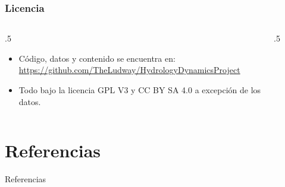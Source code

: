 \documentclass[17pt, t, lualatex]{beamer}
\begin{document}
   



\begin{frame}
  \frametitle{Licencia}

  \begin{columns}
    \begin{column}{.5\textwidth}
      \begin{itemize}
        \item Código, datos y contenido se encuentra en: \url{https://github.com/TheLudway/HydrologyDynamicsProject} 
        \item Todo bajo la licencia GPL V3 y CC BY SA 4.0 a excepción de los datos.
      \end{itemize}
    \end{column}

    \begin{column}{.5\textwidth}
      \begin{figure}[ht]
        \centering
        
      \end{figure}
    \end{column}
  \end{columns}

\end{frame}


\section{Referencias}

\insertsectionpage
\begin{frame}[allowframebreaks]{Referencias}
  \printbibliography
\end{frame}


\insertendpage
\end{document}
